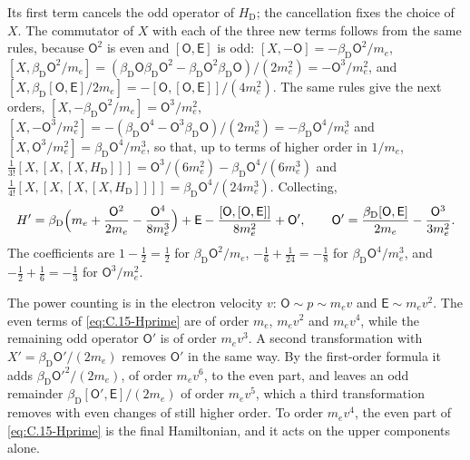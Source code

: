 Its first term cancels the odd operator of $H_{\mathrm{D}}$; the cancellation fixes the choice of $X$. The commutator of $X$ with each of the three new terms follows from the same rules, because $\mathsf{O}^2$ is even and $[\mathsf{O}, \mathsf{E}]$ is odd: $[X, -\mathsf{O}] = -\beta_{\mathrm{D}}\mathsf{O}^2/m_e$, $[X, \beta_{\mathrm{D}}\mathsf{O}^2/m_e] = (\beta_{\mathrm{D}}\mathsf{O}\beta_{\mathrm{D}}\mathsf{O}^2 - \beta_{\mathrm{D}}\mathsf{O}^2\beta_{\mathrm{D}}\mathsf{O})/(2m_e^2) = -\mathsf{O}^3/m_e^2$, and $[X, \beta_{\mathrm{D}}[\mathsf{O},\mathsf{E}]/2m_e] = -[\mathsf{O},[\mathsf{O},\mathsf{E}]]/(4m_e^2)$. The same rules give the next orders, $[X, -\beta_{\mathrm{D}}\mathsf{O}^2/m_e] = \mathsf{O}^3/m_e^2$, $[X, -\mathsf{O}^3/m_e^2] = -(\beta_{\mathrm{D}}\mathsf{O}^4 - \mathsf{O}^3\beta_{\mathrm{D}}\mathsf{O})/(2m_e^3) = -\beta_{\mathrm{D}}\mathsf{O}^4/m_e^3$ and $[X, \mathsf{O}^3/m_e^2] = \beta_{\mathrm{D}}\mathsf{O}^4/m_e^3$, so that, up to terms of higher order in $1/m_e$, $\tfrac{1}{3!}[X,[X,[X,H_{\mathrm{D}}]]] = \mathsf{O}^3/(6m_e^2) - \beta_{\mathrm{D}}\mathsf{O}^4/(6m_e^3)$ and $\tfrac{1}{4!}[X,[X,[X,[X,H_{\mathrm{D}}]]]] = \beta_{\mathrm{D}}\mathsf{O}^4/(24m_e^3)$. Collecting,
\begin{equation}
  H' = \beta_{\mathrm{D}}\Bigl(m_e + \frac{\mathsf{O}^2}{2m_e} - \frac{\mathsf{O}^4}{8m_e^3}\Bigr) + \mathsf{E} - \frac{[\mathsf{O},[\mathsf{O},\mathsf{E}]]}{8m_e^2} + \mathsf{O}', \qquad
  \mathsf{O}' = \frac{\beta_{\mathrm{D}}[\mathsf{O},\mathsf{E}]}{2m_e} - \frac{\mathsf{O}^3}{3m_e^2} .
  \label{eq:C.15-Hprime}
\end{equation}
The coefficients are $1 - \tfrac12 = \tfrac12$ for $\beta_{\mathrm{D}}\mathsf{O}^2/m_e$, $-\tfrac16 + \tfrac1{24} = -\tfrac18$ for $\beta_{\mathrm{D}}\mathsf{O}^4/m_e^3$, and $-\tfrac12 + \tfrac16 = -\tfrac13$ for $\mathsf{O}^3/m_e^2$.

The power counting is in the electron velocity $v$: $\mathsf{O} \sim p \sim m_ev$ and $\mathsf{E} \sim m_ev^2$. The even terms of \cref{eq:C.15-Hprime} are of order $m_e$, $m_ev^2$ and $m_ev^4$, while the remaining odd operator $\mathsf{O}'$ is of order $m_ev^3$. A second transformation with $X' = \beta_{\mathrm{D}}\mathsf{O}'/(2m_e)$ removes $\mathsf{O}'$ in the same way. By the first-order formula it adds $\beta_{\mathrm{D}}\mathsf{O}'^2/(2m_e)$, of order $m_ev^6$, to the even part, and leaves an odd remainder $\beta_{\mathrm{D}}[\mathsf{O}',\mathsf{E}]/(2m_e)$ of order $m_ev^5$, which a third transformation removes with even changes of still higher order. To order $m_ev^4$, the even part of \cref{eq:C.15-Hprime} is the final Hamiltonian, and it acts on the upper components alone.

